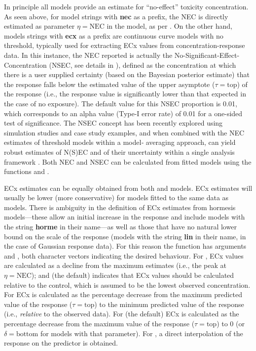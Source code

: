 \documentclass[
  shortnames]{jss}
\begin{document}
In principle all models provide an estimate for ``no-effect'' toxicity concentration. As seen above, for model strings with \textbf{nec} as a prefix, the NEC is directly estimated as parameter \(\eta = \text{NEC}\) in the model, as per \citet{Fox2010}. On the other hand, models strings with \textbf{ecx} as a prefix are continuous curve models with no threshold, typically used for extracting ECx values from concentration-response data. In this instance, the NEC reported is actually the No-Significant-Effect-Concentration (NSEC, see details in \citet{Fisher2023}), defined as the concentration at which there is a user supplied certainty (based on the Bayesian posterior estimate) that the response falls below the estimated value of the upper asymptote (\(\tau = \text{top}\)) of the response (i.e., the response value is significantly lower than that expected in the case of no exposure). The default value for this NSEC proportion is 0.01, which corresponds to an alpha value (Type-I error rate) of 0.01 for a one-sided test of significance. The NSEC concept has been recently explored using simulation studies and case study examples, and when combined with the NEC estimates of threshold models within a model‐
averaging approach, can yield robust estimates of N(S)EC and of their uncertainty within a single
analysis framework \citep{fisher2023ieam}. Both NEC and NSEC can be calculated from fitted models using the functions  and .

ECx estimates can be equally obtained from both  and  models. ECx estimates will usually be lower (more conservative) for  models fitted to the same data as  models. There is ambiguity in the definition of ECx estimates from hormesis models---these allow an initial increase in the response \citep[see][]{Mattson2008} and include models with the string \textbf{horme} in their name---as well as those that have no natural lower bound on the scale of the response (models with the string \textbf{lin} in their name, in the case of Gaussian response data). For this reason the  function has arguments  and , both character vectors indicating the desired behaviour. For , ECx values are calculated as a decline from the maximum estimates (i.e., the peak at \(\eta = \text{NEC}\)); and  (the default) indicates that ECx values should be calculated relative to the control, which is assumed to be the lowest observed concentration. For  ECx is calculated as the percentage decrease from the maximum predicted value of the response (\(\tau = \text{top}\)) to the minimum predicted value of the response (i.e., \emph{relative} to the observed data). For  (the default) ECx is calculated as the percentage decrease from the maximum value of the response (\(\tau = \text{top}\)) to 0 (or \(\delta = \text{bottom}\) for models with that parameter). For , a direct interpolation of the response on the predictor is obtained.
\end{document}
